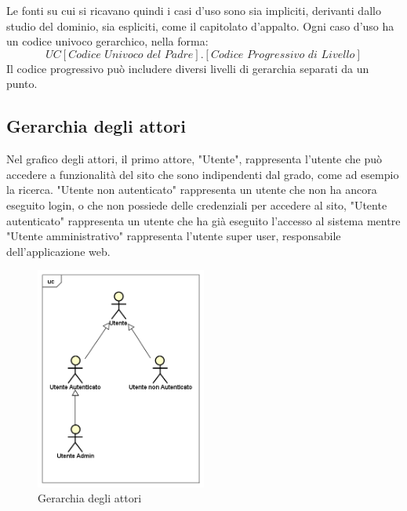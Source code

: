 \documentclass[12pt,a4paper,titlepage]{article}
\begin{document}
	Le fonti su cui si ricavano quindi i casi d'uso sono sia impliciti, derivanti dallo studio del dominio, sia espliciti, come il capitolato d'appalto.
	Ogni caso d'uso ha un codice univoco gerarchico, nella forma: 
	\[UC[\textit{Codice Univoco del Padre}].[\textit{Codice Progressivo di Livello}]\] 
	Il codice progressivo può includere diversi livelli di gerarchia separati da un punto.
	\subsection{Gerarchia degli attori}
	Nel grafico degli attori, il primo attore, "Utente", rappresenta l'utente che può accedere a funzionalità del sito che sono indipendenti dal grado, come ad esempio la ricerca. "Utente non autenticato" rappresenta un utente che non ha ancora eseguito login, o che non possiede delle credenziali per accedere al sito, "Utente autenticato" rappresenta un utente che ha già eseguito l'accesso al sistema mentre "Utente amministrativo" rappresenta l'utente super user, responsabile dell'applicazione web.
	\begin{figure}[ht]
		\centering
		\includegraphics[width=0.5\textwidth]{UseCase/Attori}
		\caption{Gerarchia degli attori}
	\end{figure}
	\clearpage
\end{document}

